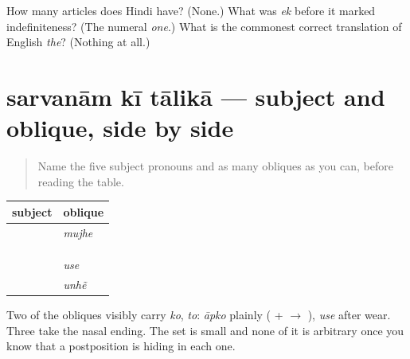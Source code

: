 \begin{tcolorbox}[breakable,colback=teal!4,colframe=teal!35!black,title={Before you move on}]
How many articles does Hindi have? (None.) What was \emph{ek} before it marked indefiniteness? (The numeral \emph{one}.) What is the commonest correct translation of English \emph{the}? (Nothing at all.)
\end{tcolorbox}
\section[\texorpdfstring{\hi{सर्वनाम} \hi{की} \hi{तालिका} (sarvanām kī tālikā)}{सर्वनाम की तालिका (sarvanām kī tālikā)}]{sarvanām kī tālikā — subject and oblique, side by side}

\label{lesson:HI-C86-repaso-sarvanam}



\begin{quote}
Name the five subject pronouns and as many obliques as you can, before reading the table.
\end{quote}

\begin{grammarlens}[title={Grammar Lens: the table, complete}]
\noindent
\begin{tabularx}{\linewidth}{@{}>{\raggedright\arraybackslash}X>{\raggedright\arraybackslash}X@{}}
\toprule
\textbf{subject} & \textbf{oblique} \\
\midrule
\hi{मैं} & \emph{mujhe} \\
\hi{हम} & \hi{हमें} \\
\hi{तुम} & \hi{तुम्हें} \\
\hi{आप} & \hi{आपको} \\
\hi{वह} & \emph{use} \\
\hi{वे} & \emph{unhẽ} \\
\bottomrule
\end{tabularx}

Two of the obliques visibly carry \emph{ko}, \emph{to}: \emph{āpko} plainly (\textbf{} + \textbf{} $\to$ \textbf{}), \emph{use} after wear. Three take the nasal ending. The set is small and none of it is arbitrary once you know that a postposition is hiding in each one.
\end{grammarlens}

